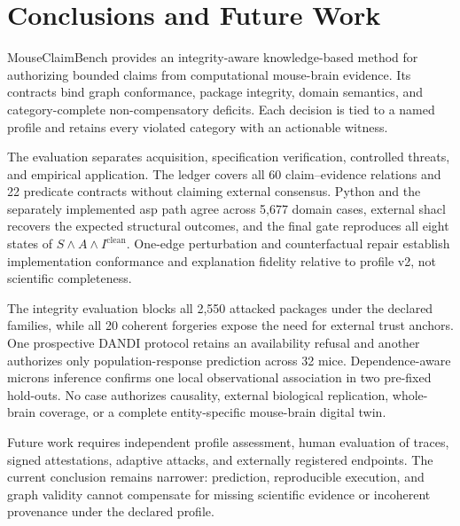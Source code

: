 \section{Conclusions and Future Work}
\label{sec:conclusions}

MouseClaimBench provides an integrity-aware knowledge-based method for authorizing bounded claims from computational mouse-brain evidence. Its contracts bind graph conformance, package integrity, domain semantics, and category-complete non-compensatory deficits. Each decision is tied to a named profile and retains every violated category with an actionable witness.

The evaluation separates acquisition, specification verification, controlled threats, and empirical application. The ledger covers all 60 claim--evidence relations and 22 predicate contracts without claiming external consensus. Python and the separately implemented \ac{asp} path agree across 5,677 domain cases, external \ac{shacl} recovers the expected structural outcomes, and the final gate reproduces all eight states of $S\land A\land I^{\mathrm{clean}}$. One-edge perturbation and counterfactual repair establish implementation conformance and explanation fidelity relative to profile v2, not scientific completeness.

The integrity evaluation blocks all 2,550 attacked packages under the declared families, while all 20 coherent forgeries expose the need for external trust anchors. One prospective DANDI protocol retains an availability refusal and another authorizes only population-response prediction across 32 mice. Dependence-aware \ac{microns} inference confirms one local observational association in two pre-fixed hold-outs. No case authorizes causality, external biological replication, whole-brain coverage, or a complete entity-specific mouse-brain digital twin.

Future work requires independent profile assessment, human evaluation of traces, signed attestations, adaptive attacks, and externally registered endpoints. The current conclusion remains narrower: prediction, reproducible execution, and graph validity cannot compensate for missing scientific evidence or incoherent provenance under the declared profile.
